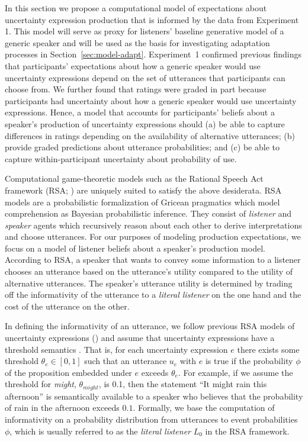 \documentclass[man, floatsintext]{apa6}
\newcommand{\sectionref}[1]{Section~\ref{#1}}
\begin{document}
In this section we propose a computational model of expectations about uncertainty expression production that is informed by the data from Experiment 1. This model will serve as proxy for listeners' baseline generative model of a generic speaker and will be used as the basis for investigating adaptation processes in \sectionref{sec:model-adapt}. Experiment~1 confirmed previous findings that participants' expectations 
about how a generic speaker would use uncertainty expressions 
depend on the set of utterances that participants can choose from.
We further found that ratings were graded in part because participants had uncertainty about how a generic speaker would use uncertainty expressions. 
Hence, a model that accounts for participants' beliefs about a speaker's production of uncertainty expressions
 should  (a) be able to capture differences in ratings depending on the availability of alternative utterances;
(b) provide graded predictions about utterance probabilities; 
and (c) be able to capture within-participant uncertainty about probability of use.

Computational game-theoretic models such as the Rational Speech Act 
framework (RSA; \cite{Goodman2016})  are uniquely suited to satisfy the above desiderata.
RSA models are a probabilistic formalization of Gricean pragmatics which model comprehension as Bayesian probabilistic inference. 
They consist of \textit{listener} and \textit{speaker} agents which recursively reason about each other to derive interpretations and choose utterances. 
For our purposes of modeling production expectations, we focus on a model of listener beliefs about a speaker's production model.
  According to  RSA, a {speaker} that wants to
 convey some information to a {listener}
chooses an utterance based on the utterance's utility compared to the utility of alternative utterances. 
The {speaker}'s utterance utility is determined by trading off the informativity of the utterance to a \textit{literal listener} on the one hand and the cost of the utterance on the other.

In defining the informativity of an utterance, we follow previous RSA models of uncertainty expressions (\cite{Herbstritt2019}) 
and assume that uncertainty expressions have a threshold semantics \parencite{Swanson2006,Yalcin2010,Lassiter2016}. That is, for each uncertainty expression $e$ there exists some threshold $\theta_e \in [0,1]$ 
such that an utterance $u_e$ with $e$ is true if the probability $\phi$ 
of the proposition embedded under $e$ exceeds $\theta_e$. 
For example, if we assume the threshold for \textit{might}, $\theta_{might}$, is 0.1, then the statement 
``It might rain this afternoon'' is semantically available to a {speaker} who believes that the probability of rain in the afternoon exceeds $0.1$.
Formally, we base the computation of informativity on a probability distribution from utterances to event probabilities $\phi$, 
which is usually referred to as the \textit{literal listener} $L_0$ in the RSA framework. 
\end{document}
